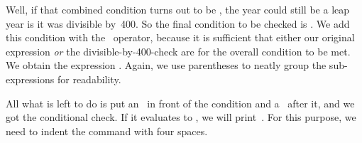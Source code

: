 \begin{sloppypar}%
Well, if that combined condition turns out to be , the year could still be a leap year is it was divisible by~400.
So the final condition to be checked is .
We add this condition with the ~operator, because it is sufficient that either our original expression \emph{or} the divisible-by-400-check are  for the overall condition to be met.
We obtain the expression .
Again, we use parentheses to neatly group the sub-expressions for readability.%
\end{sloppypar}%
%
All what is left to do is put an~ in front of the condition and a~\pythonilIdx{:} after it, and we got the conditional check.
If it evaluates to , we will print~.
For this purpose, we need to indent the  command with four spaces.

